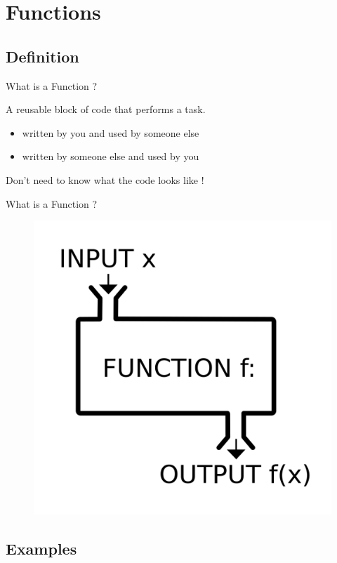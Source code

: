 \section{Functions}

\subsection{Definition}
\begin{frame}[fragile]{What is a Function ?}{}
    \LARGE
    \begin{block}{}
        A reusable block of code that performs a task.
    \end{block}
    \pause
    \begin{itemize}
        \item written by you and used by someone else
        \item written by someone else and used by you
    \end{itemize}
    \pause
    \begin{block}{}
        Don't need to know what the code looks like !
    \end{block}
\end{frame}

\begin{frame}[fragile]{What is a Function ?}{}
\begin{figure}
    \begin{center}
        \includegraphics[width=0.7\linewidth]{images/bb.png}
    \end{center}
\end{figure}
\end{frame}


\subsection{Examples}

